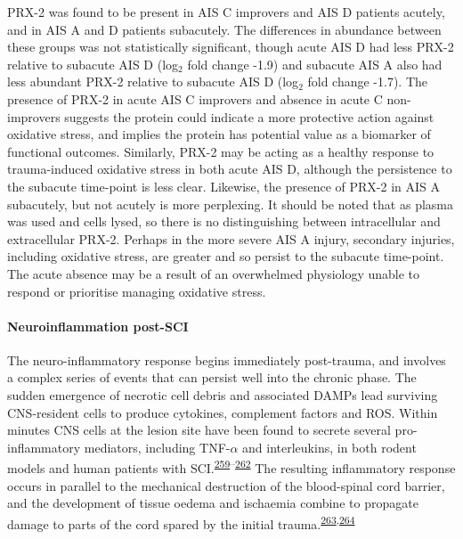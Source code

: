 \documentclass[
]{article}
\begin{document}
PRX-2 was found to be present in AIS C improvers and AIS D patients acutely, and in AIS A and D patients subacutely.
The differences in abundance between these groups was not statistically significant, though acute AIS D had less PRX-2 relative to subacute AIS D (log\(_2\) fold change -1.9) and subacute AIS A also had less abundant PRX-2 relative to subacute AIS D (log\(_2\) fold change -1.7).
The presence of PRX-2 in acute AIS C improvers and absence in acute C non-improvers suggests the protein could indicate a more protective action against oxidative stress, and implies the protein has potential value as a biomarker of functional outcomes.
Similarly, PRX-2 may be acting as a healthy response to trauma-induced oxidative stress in both acute AIS D, although the persistence to the subacute time-point is less clear.
Likewise, the presence of PRX-2 in AIS A subacutely, but not acutely is more perplexing.
It should be noted that as plasma was used and cells lysed, so there is no distinguishing between intracellular and extracellular PRX-2.
Perhaps in the more severe AIS A injury, secondary injuries, including oxidative stress, are greater and so persist to the subacute time-point.
The acute absence may be a result of an overwhelmed physiology unable to respond or prioritise managing oxidative stress.

\hypertarget{neuroinflammation-post-sci}{%
\paragraph{Neuroinflammation post-SCI}\label{neuroinflammation-post-sci}}

The neuro-inflammatory response begins immediately post-trauma, and involves a complex series of events that can persist well into the chronic phase.
The sudden emergence of necrotic cell debris and associated DAMPs lead surviving CNS-resident cells to produce cytokines, complement factors and ROS.
Within minutes CNS cells at the lesion site have been found to secrete several pro-inflammatory mediators, including TNF-\(\alpha\) and interleukins, in both rodent models and human patients with SCI.\textsuperscript{\protect\hyperlink{ref-pineau_proinflammatory_2007}{259}--\protect\hyperlink{ref-bastien_il-1_2015}{262}}
The resulting inflammatory response occurs in parallel to the mechanical destruction of the blood-spinal cord barrier, and the development of tissue oedema and ischaemia combine to propagate damage to parts of the cord spared by the initial trauma.\textsuperscript{\protect\hyperlink{ref-maikos_immediate_2007}{263},\protect\hyperlink{ref-ahuja_traumatic_2017}{264}}
\end{document}
